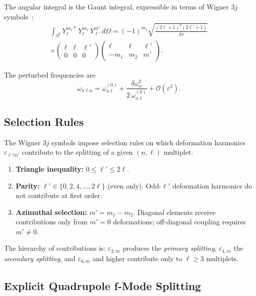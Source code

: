 \documentclass[aps,prd,twocolumn,superscriptaddress,nofootinbib]{revtex4-2}
\newcommand{\order}[1]{\mathcal{O}(#1)}
\begin{document}
The angular integral is the Gaunt integral, expressible in terms of Wigner
$3j$ symbols~\cite{Varshalovich1988}:
\begin{multline}
\int_{S^2} Y_\ell^{m_1 *} \, Y_\ell^{m_2} \, Y_{\ell'}^{m'} \, d\Omega
= (-1)^{m_1} \sqrt{\frac{(2\ell+1)^2 (2\ell'+1)}{4\pi}} \\
\times \begin{pmatrix} \ell & \ell & \ell' \\ 0 & 0 & 0 \end{pmatrix}
\begin{pmatrix} \ell & \ell & \ell' \\ -m_1 & m_2 & m' \end{pmatrix}.
\label{eq:gaunt}
\end{multline}

The perturbed frequencies are
\begin{equation}
\omega_{n\ell\alpha} = \omega_{n\ell}^{(0)} +
\frac{\delta\omega^2_\alpha}{2\,\omega_{n\ell}^{(0)}} +
\order{\varepsilon^2}.
\label{eq:perturbed_freq}
\end{equation}


\subsection{Selection Rules}
\label{sec:selection}

The Wigner $3j$ symbols impose selection rules on which deformation
harmonics $\varepsilon_{\ell' m'}$ contribute to the splitting of a given
$(n,\ell)$ multiplet:

\begin{enumerate}
\item \textbf{Triangle inequality:} $0 \leq \ell' \leq 2\ell$.
\item \textbf{Parity:} $\ell' \in \{0, 2, 4, \ldots, 2\ell\}$ (even only).
  Odd-$\ell'$ deformation harmonics do not contribute at first order.
\item \textbf{Azimuthal selection:} $m' = m_1 - m_2$.
  Diagonal elements receive contributions only from $m' = 0$
  deformations; off-diagonal coupling requires $m' \neq 0$.
\end{enumerate}

The hierarchy of contributions is: $\varepsilon_{2,m}$ produces the
\textit{primary splitting}, $\varepsilon_{4,m}$ the \textit{secondary
splitting}, and $\varepsilon_{6,m}$ and higher contribute only to
$\ell \geq 3$ multiplets.


\subsection{Explicit Quadrupole f-Mode Splitting}
\label{sec:l2_splitting}
\end{document}
